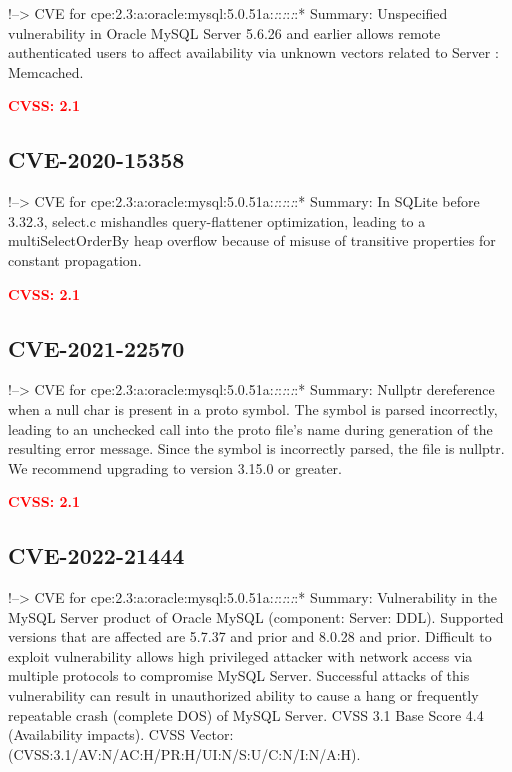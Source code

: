 \documentclass[a4paper, 12pt]{article}
\begin{document}
!--\textgreater{} CVE for
cpe:2.3:a:oracle:mysql:5.0.51a:\emph{:}:\emph{:}:\emph{:}:* Summary:
Unspecified vulnerability in Oracle MySQL Server 5.6.26 and earlier
allows remote authenticated users to affect availability via unknown
vectors related to Server : Memcached.

\textbf{\textcolor{red}{CVSS: 2.1}}

\hypertarget{cve-2020-15358}{%
\subsection{CVE-2020-15358}\label{cve-2020-15358}}

!--\textgreater{} CVE for
cpe:2.3:a:oracle:mysql:5.0.51a:\emph{:}:\emph{:}:\emph{:}:* Summary: In
SQLite before 3.32.3, select.c mishandles query-flattener optimization,
leading to a multiSelectOrderBy heap overflow because of misuse of
transitive properties for constant propagation.

\textbf{\textcolor{red}{CVSS: 2.1}}

\hypertarget{cve-2021-22570}{%
\subsection{CVE-2021-22570}\label{cve-2021-22570}}

!--\textgreater{} CVE for
cpe:2.3:a:oracle:mysql:5.0.51a:\emph{:}:\emph{:}:\emph{:}:* Summary:
Nullptr dereference when a null char is present in a proto symbol. The
symbol is parsed incorrectly, leading to an unchecked call into the
proto file's name during generation of the resulting error message.
Since the symbol is incorrectly parsed, the file is nullptr. We
recommend upgrading to version 3.15.0 or greater.

\textbf{\textcolor{red}{CVSS: 2.1}}

\hypertarget{cve-2022-21444}{%
\subsection{CVE-2022-21444}\label{cve-2022-21444}}

!--\textgreater{} CVE for
cpe:2.3:a:oracle:mysql:5.0.51a:\emph{:}:\emph{:}:\emph{:}:* Summary:
Vulnerability in the MySQL Server product of Oracle MySQL (component:
Server: DDL). Supported versions that are affected are 5.7.37 and prior
and 8.0.28 and prior. Difficult to exploit vulnerability allows high
privileged attacker with network access via multiple protocols to
compromise MySQL Server. Successful attacks of this vulnerability can
result in unauthorized ability to cause a hang or frequently repeatable
crash (complete DOS) of MySQL Server. CVSS 3.1 Base Score 4.4
(Availability impacts). CVSS Vector:
(CVSS:3.1/AV:N/AC:H/PR:H/UI:N/S:U/C:N/I:N/A:H).
\end{document}

